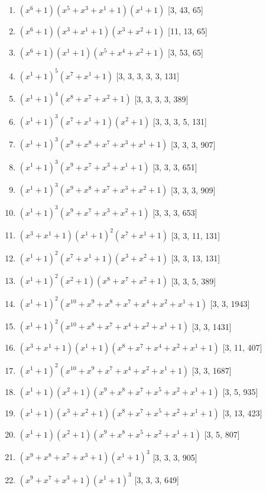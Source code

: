 \documentclass[10pt,twocolumn]{article}
\begin{document}
\begin{enumerate}
\item $(x^{6} + 1)(x^{5} + x^{3} + x^{1} + 1)(x^{1} + 1)$  [3, 43, 65]
\item $(x^{6} + 1)(x^{3} + x^{1} + 1)(x^{3} + x^{2} + 1)$  [11, 13, 65]
\item $(x^{6} + 1)(x^{1} + 1)(x^{5} + x^{4} + x^{2} + 1)$  [3, 53, 65]
\item $(x^{1} + 1)^{5}(x^{7} + x^{1} + 1)$  [3, 3, 3, 3, 3, 131]
\item $(x^{1} + 1)^{4}(x^{8} + x^{7} + x^{2} + 1)$  [3, 3, 3, 3, 389]
\item $(x^{1} + 1)^{3}(x^{7} + x^{1} + 1)(x^{2} + 1)$  [3, 3, 3, 5, 131]
\item $(x^{1} + 1)^{3}(x^{9} + x^{8} + x^{7} + x^{3} + x^{1} + 1)$  [3, 3, 3, 907]
\item $(x^{1} + 1)^{3}(x^{9} + x^{7} + x^{3} + x^{1} + 1)$  [3, 3, 3, 651]
\item $(x^{1} + 1)^{3}(x^{9} + x^{8} + x^{7} + x^{3} + x^{2} + 1)$  [3, 3, 3, 909]
\item $(x^{1} + 1)^{3}(x^{9} + x^{7} + x^{3} + x^{2} + 1)$  [3, 3, 3, 653]
\item $(x^{3} + x^{1} + 1)(x^{1} + 1)^{2}(x^{7} + x^{1} + 1)$  [3, 3, 11, 131]
\item $(x^{1} + 1)^{2}(x^{7} + x^{1} + 1)(x^{3} + x^{2} + 1)$  [3, 3, 13, 131]
\item $(x^{1} + 1)^{2}(x^{2} + 1)(x^{8} + x^{7} + x^{2} + 1)$  [3, 3, 5, 389]
\item $(x^{1} + 1)^{2}(x^{10} + x^{9} + x^{8} + x^{7} + x^{4} + x^{2} + x^{1} + 1)$  [3, 3, 1943]
\item $(x^{1} + 1)^{2}(x^{10} + x^{8} + x^{7} + x^{4} + x^{2} + x^{1} + 1)$  [3, 3, 1431]
\item $(x^{3} + x^{1} + 1)(x^{1} + 1)(x^{8} + x^{7} + x^{4} + x^{2} + x^{1} + 1)$  [3, 11, 407]
\item $(x^{1} + 1)^{2}(x^{10} + x^{9} + x^{7} + x^{4} + x^{2} + x^{1} + 1)$  [3, 3, 1687]
\item $(x^{1} + 1)(x^{2} + 1)(x^{9} + x^{8} + x^{7} + x^{5} + x^{2} + x^{1} + 1)$  [3, 5, 935]
\item $(x^{1} + 1)(x^{3} + x^{2} + 1)(x^{8} + x^{7} + x^{5} + x^{2} + x^{1} + 1)$  [3, 13, 423]
\item $(x^{1} + 1)(x^{2} + 1)(x^{9} + x^{8} + x^{5} + x^{2} + x^{1} + 1)$  [3, 5, 807]
\item $(x^{9} + x^{8} + x^{7} + x^{3} + 1)(x^{1} + 1)^{3}$  [3, 3, 3, 905]
\item $(x^{9} + x^{7} + x^{3} + 1)(x^{1} + 1)^{3}$  [3, 3, 3, 649]

\end{enumerate}
\end{document}
